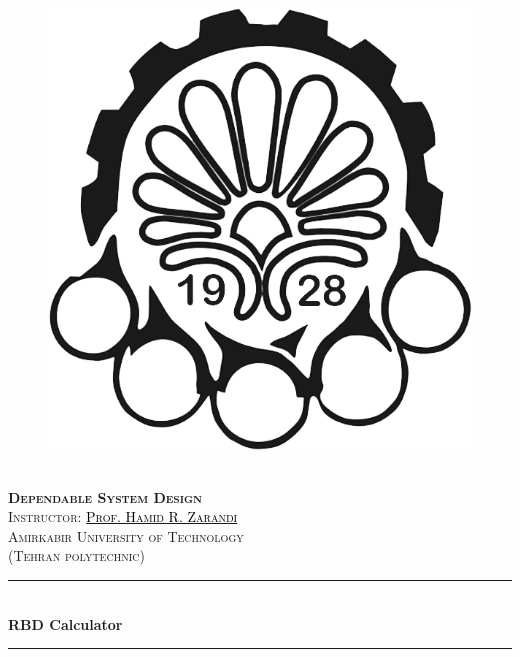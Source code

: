 \documentclass[12pt	]{article}
\newcommand{\HRule}{\rule{\linewidth}{0.5mm}} %
\begin{document}
\begin{center}
    \begin{figure}
        \vspace{-1.0cm}
        \centering
        \includegraphics[scale = 0.35]{Images/AUT_logo.png} %
    \end{figure}
    \mbox{}\\[2.0cm]
    \textsc{\Huge \textbf{Dependable System Design}}\\[1.0cm]
    \textsc{\LARGE Instructor: \href{https://scholar.google.com/citations?user=ZA9rRWAAAAAJ&hl=en}{\textcolor{black}{Prof. Hamid R. Zarandi}}}\\[2.5cm]
    \textsc{\LARGE Amirkabir University of Technology} \\%
    \textsc{(Tehran polytechnic)}
    \HRule\\[0.4cm]
    {\large \bf {\selectfont RBD Calculator} }\\[0.2cm]
    \HRule\\[1.5cm]
\end{center}
\end{document}
